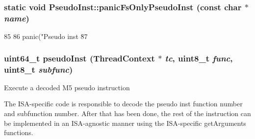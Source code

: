 \label{namespacePseudoInst_a651838ae3cd047fdc85bd84e3f2215fd}
\hypertarget{namespacePseudoInst_a0f1851194796f78b9481418d9021a748}{
\subsubsection[{panicFsOnlyPseudoInst}]{\setlength{\rightskip}{0pt plus 5cm}static void PseudoInst::panicFsOnlyPseudoInst (const char $\ast$ {\em name})}}
\label{namespacePseudoInst_a0f1851194796f78b9481418d9021a748}



\begin{DoxyCode}
85 {
86     panic("Pseudo inst \"%
87 }
\end{DoxyCode}
\hypertarget{namespacePseudoInst_a469ba8e314952a0076e086dee22ea6de}{
\subsubsection[{pseudoInst}]{\setlength{\rightskip}{0pt plus 5cm}uint64\_\-t pseudoInst ({\bf ThreadContext} $\ast$ {\em tc}, \/  uint8\_\-t {\em func}, \/  uint8\_\-t {\em subfunc})}}
\label{namespacePseudoInst_a469ba8e314952a0076e086dee22ea6de}
Execute a decoded M5 pseudo instruction

The ISA-\/specific code is responsible to decode the pseudo inst function number and subfunction number. After that has been done, the rest of the instruction can be implemented in an ISA-\/agnostic manner using the ISA-\/specific getArguments functions.


